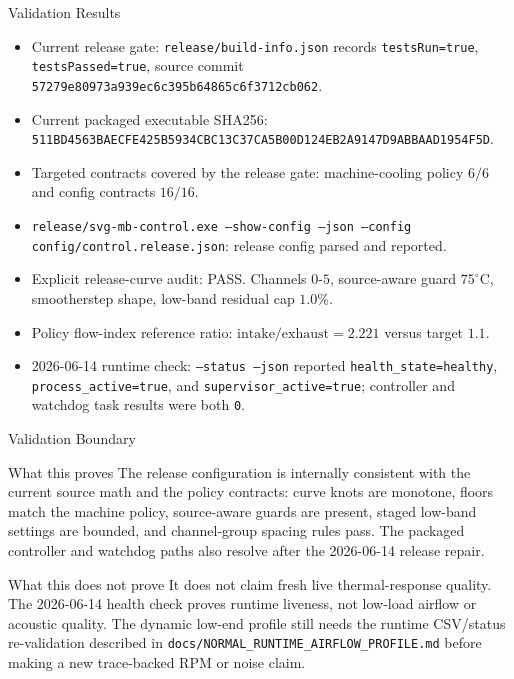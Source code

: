 \documentclass[aspectratio=169]{beamer}
\newcommand{\cfg}{\texttt}
\begin{document}
\begin{frame}{Validation Results}
  \begin{itemize}
    \item Current release gate: \cfg{release/build-info.json} records
      \cfg{testsRun=true}, \cfg{testsPassed=true}, source commit
      \cfg{57279e80973a939ec6c395b64865c6f3712cb062}.
    \item Current packaged executable SHA256:\\
      {\scriptsize\cfg{511BD4563BAECFE425B5934CBC13C37CA5B00D124EB2A9147D9ABBAAD1954F5D}}.
    \item Targeted contracts covered by the release gate:
      machine-cooling policy $6/6$ and config contracts $16/16$.
    \item \cfg{release/svg-mb-control.exe --show-config --json --config
      config/control.release.json}: release config parsed and reported.
    \item Explicit release-curve audit: PASS.
      Channels $0$-$5$, source-aware guard $75^\circ$C, smootherstep shape,
      low-band residual cap $1.0\%$.
    \item Policy flow-index reference ratio:
      $\mathrm{intake}/\mathrm{exhaust}=2.221$ versus target $1.1$.
    \item 2026-06-14 runtime check: \cfg{--status --json} reported
      \cfg{health\_state=healthy}, \cfg{process\_active=true}, and
      \cfg{supervisor\_active=true}; controller and watchdog task results
      were both \cfg{0}.
  \end{itemize}
\end{frame}

\begin{frame}{Validation Boundary}
  \begin{block}{What this proves}
    The release configuration is internally consistent with the current source
    math and the policy contracts: curve knots are monotone, floors match the
    machine policy, source-aware guards are present, staged low-band settings
    are bounded, and channel-group spacing rules pass. The packaged controller
    and watchdog paths also resolve after the 2026-06-14 release repair.
  \end{block}
  \begin{block}{What this does not prove}
    It does not claim fresh live thermal-response quality. The 2026-06-14
    health check proves runtime liveness, not low-load airflow or acoustic
    quality. The dynamic low-end profile still needs the runtime CSV/status
    re-validation described in \cfg{docs/NORMAL\_RUNTIME\_AIRFLOW\_PROFILE.md}
    before making a new trace-backed RPM or noise claim.
  \end{block}
\end{frame}
\end{document}
